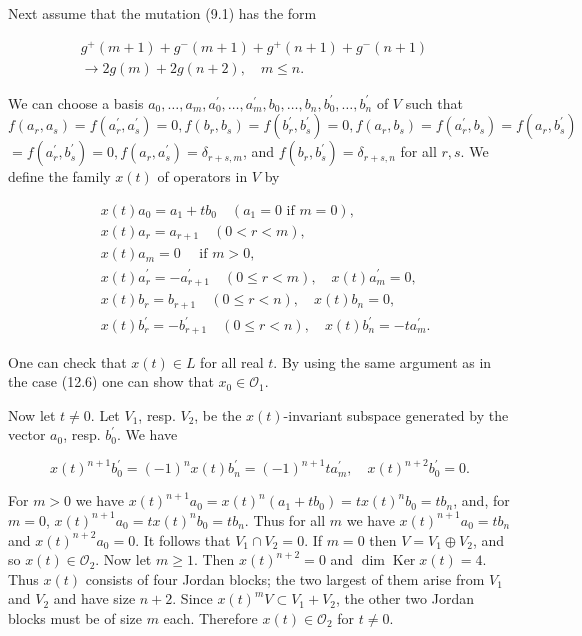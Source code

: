 \documentclass[10pt]{article}
\begin{document}
Next assume that the mutation (9.1) has the form


\begin{align*}
g^{+}(m+1)+g^{-}(m+1)+g^{+}(n+1)+g^{-}(n+1) &\\
\rightarrow 2 g(m)+2 g(n+2), \quad m \leqslant n .
& \tag{12.9}\end{align*}


We can choose a basis $a_{0}, \ldots, a_{m}, a_{0}^{\prime}, \ldots, a_{m}^{\prime}, b_{0}, \ldots, b_{n}, b_{0}^{\prime}, \ldots, b_{n}^{\prime}$ of $V$ such that $f\left(a_{r}, a_{s}\right)=f\left(a_{r}^{\prime}, a_{s}^{\prime}\right)=0, f\left(b_{r}, b_{s}\right)=f\left(b_{r}^{\prime}, b_{s}^{\prime}\right)=0, f\left(a_{r}, b_{s}\right)=f\left(a_{r}^{\prime}, b_{s}\right)=f\left(a_{r}, b_{s}^{\prime}\right)$ $=f\left(a_{r}^{\prime}, b_{s}^{\prime}\right)=0, f\left(a_{r}, a_{s}^{\prime}\right)=\delta_{r+s, m}$, and $f\left(b_{r}, b_{s}^{\prime}\right)=\delta_{r+s, n}$ for all $r, s$. We define the family $x(t)$ of operators in $V$ by

$$
\begin{aligned}
& x(t) a_{0}=a_{1}+t b_{0} \quad\left(a_{1}=0 \text { if } m=0\right), \\
& x(t) a_{r}=a_{r+1} \quad(0<r<m), \\
& x(t) a_{m}=0 \quad \text { if } m>0, \\
& x(t) a_{r}^{\prime}=-a_{r+1}^{\prime} \quad(0 \leqslant r<m), \quad x(t) a_{m}^{\prime}=0, \\
& x(t) b_{r}=b_{r+1} \quad(0 \leqslant r<n), \quad x(t) b_{n}=0, \\
& x(t) b_{r}^{\prime}=-b_{r+1}^{\prime} \quad(0 \leqslant r<n), \quad x(t) b_{n}^{\prime}=-t a_{m}^{\prime} .
\end{aligned}
$$

One can check that $x(t) \in L$ for all real $t$. By using the same argument as in the case (12.6) one can show that $x_{0} \in \mathcal{O}_{1}$.

Now let $t \neq 0$. Let $V_{1}$, resp. $V_{2}$, be the $x(t)$-invariant subspace generated by the vector $a_{0}$, resp. $b_{0}^{\prime}$. We have

$$
x(t)^{n+1} b_{0}^{\prime}=(-1)^{n} x(t) b_{n}^{\prime}=(-1)^{n+1} t a_{m}^{\prime}, \quad x(t)^{n+2} b_{0}^{\prime}=0 .
$$

For $m>0$ we have $x(t)^{n+1} a_{0}=x(t)^{n}\left(a_{1}+t b_{0}\right)=t x(t)^{n} b_{0}=t b_{n}$, and, for $m=0$, $x(t)^{n+1} a_{0}=t x(t)^{n} b_{0}=t b_{n}$. Thus for all $m$ we have $x(t)^{n+1} a_{0}=t b_{n}$ and $x(t)^{n+2} a_{0}=0$. It follows that $V_{1} \cap V_{2}=0$. If $m=0$ then $V=V_{1} \oplus V_{2}$, and so $x(t) \in \mathcal{O}_{2}$. Now let $m \geqslant 1$. Then $x(t)^{n+2}=0$ and $\operatorname{dim} \operatorname{Ker} x(t)=4$. Thus $x(t)$ consists of four Jordan blocks; the two largest of them arise from $V_{1}$ and $V_{2}$ and have size $n+2$. Since $x(t)^{m} V \subset V_{1}+V_{2}$, the other two Jordan blocks must be of size $m$ each. Therefore $x(t) \in \mathcal{O}_{2}$ for $t \neq 0$.
\end{document}
